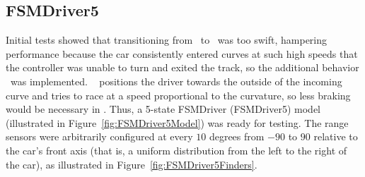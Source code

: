 \subsection{FSMDriver5}

Initial tests showed that transitioning from \SL~to \C~was too swift, hampering performance because the car consistently entered curves at such high speeds that the controller was unable to turn and exited the track, so the additional behavior \AC~was implemented. \AC~ positions the driver towards the outside of the incoming curve and tries to race at a speed proportional to the curvature, so less braking would be necessary in \C. Thus, a 5-state FSMDriver (FSMDriver5) model (illustrated in Figure~\ref{fig:FSMDriver5Model}) was ready for testing. The range sensors were arbitrarily configured at every $10$ degrees from $-90$ to $90$ relative to the car's front axis (that is, a uniform distribution from the left to the right of the car), as illustrated in Figure~\ref{fig:FSMDriver5Finders}.

